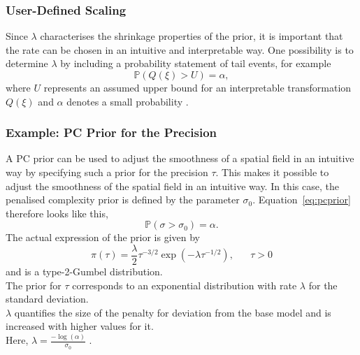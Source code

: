 \subsubsection*{User-Defined Scaling}
Since $\lambda$ characterises the shrinkage properties of the prior, it is important that the rate can be chosen in an intuitive and interpretable way. One possibility is to determine $\lambda$ by including a probability statement of tail events, for example
\begin{equation}\label{eq:pcprior}
    \mathbb{P}\left(Q\left(\xi\right) > U\right)=\alpha,
\end{equation}
where $U$ represents an assumed upper bound for an interpretable transformation $Q\left(\xi\right)$ and $\alpha$ denotes a small probability \autocite[][]{martins2014penalising}.
\subsubsection{Example: PC Prior for the Precision}
A PC prior can be used to adjust the smoothness of a spatial field in an intuitive way by specifying such a prior for the precision $\tau$. This makes it possible to adjust the smoothness of the spatial field in an intuitive way. In this case, the penalised complexity prior is defined by the parameter $\sigma_0$. Equation~\ref{eq:pcprior} therefore looks like this,
\begin{equation}\label{pcprec}
    \mathbb{P}\left(\sigma > \sigma_0\right)=\alpha.
\end{equation}
The actual expression of the prior is given by
\begin{equation}\label{eq:pc_prior_prec}
    \pi\left(\tau\right)=\frac{\lambda}{2}\tau^{-3/2}\exp\left(-\lambda\tau^{-1/2}\right),\hspace{20pt}\tau>0
\end{equation}
and is a type-2-Gumbel distribution. \\
The prior for $\tau$ corresponds to an exponential distribution with rate $\lambda$ for the standard deviation. \\
$\lambda$ quantifies the size of the penalty for deviation from the base model and is increased with higher values for it. \\
Here, $\lambda=\frac{-\log\left(\alpha\right)}{\sigma_0}$ \autocite[][]{martins2014penalising}.
\clearpage
